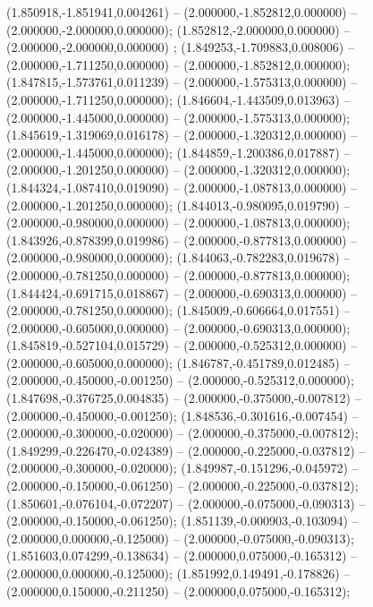  (1.850918,-1.851941,0.004261) -- (2.000000,-1.852812,0.000000) -- (2.000000,-2.000000,0.000000);
 (1.852812,-2.000000,0.000000) -- (2.000000,-2.000000,0.000000) ;
 (1.849253,-1.709883,0.008006) -- (2.000000,-1.711250,0.000000) -- (2.000000,-1.852812,0.000000);
 (1.847815,-1.573761,0.011239) -- (2.000000,-1.575313,0.000000) -- (2.000000,-1.711250,0.000000);
 (1.846604,-1.443509,0.013963) -- (2.000000,-1.445000,0.000000) -- (2.000000,-1.575313,0.000000);
 (1.845619,-1.319069,0.016178) -- (2.000000,-1.320312,0.000000) -- (2.000000,-1.445000,0.000000);
 (1.844859,-1.200386,0.017887) -- (2.000000,-1.201250,0.000000) -- (2.000000,-1.320312,0.000000);
 (1.844324,-1.087410,0.019090) -- (2.000000,-1.087813,0.000000) -- (2.000000,-1.201250,0.000000);
 (1.844013,-0.980095,0.019790) -- (2.000000,-0.980000,0.000000) -- (2.000000,-1.087813,0.000000);
 (1.843926,-0.878399,0.019986) -- (2.000000,-0.877813,0.000000) -- (2.000000,-0.980000,0.000000);
 (1.844063,-0.782283,0.019678) -- (2.000000,-0.781250,0.000000) -- (2.000000,-0.877813,0.000000);
 (1.844424,-0.691715,0.018867) -- (2.000000,-0.690313,0.000000) -- (2.000000,-0.781250,0.000000);
 (1.845009,-0.606664,0.017551) -- (2.000000,-0.605000,0.000000) -- (2.000000,-0.690313,0.000000);
 (1.845819,-0.527104,0.015729) -- (2.000000,-0.525312,0.000000) -- (2.000000,-0.605000,0.000000);
 (1.846787,-0.451789,0.012485) -- (2.000000,-0.450000,-0.001250) -- (2.000000,-0.525312,0.000000);
 (1.847698,-0.376725,0.004835) -- (2.000000,-0.375000,-0.007812) -- (2.000000,-0.450000,-0.001250);
 (1.848536,-0.301616,-0.007454) -- (2.000000,-0.300000,-0.020000) -- (2.000000,-0.375000,-0.007812);
 (1.849299,-0.226470,-0.024389) -- (2.000000,-0.225000,-0.037812) -- (2.000000,-0.300000,-0.020000);
 (1.849987,-0.151296,-0.045972) -- (2.000000,-0.150000,-0.061250) -- (2.000000,-0.225000,-0.037812);
 (1.850601,-0.076104,-0.072207) -- (2.000000,-0.075000,-0.090313) -- (2.000000,-0.150000,-0.061250);
 (1.851139,-0.000903,-0.103094) -- (2.000000,0.000000,-0.125000) -- (2.000000,-0.075000,-0.090313);
 (1.851603,0.074299,-0.138634) -- (2.000000,0.075000,-0.165312) -- (2.000000,0.000000,-0.125000);
 (1.851992,0.149491,-0.178826) -- (2.000000,0.150000,-0.211250) -- (2.000000,0.075000,-0.165312);

